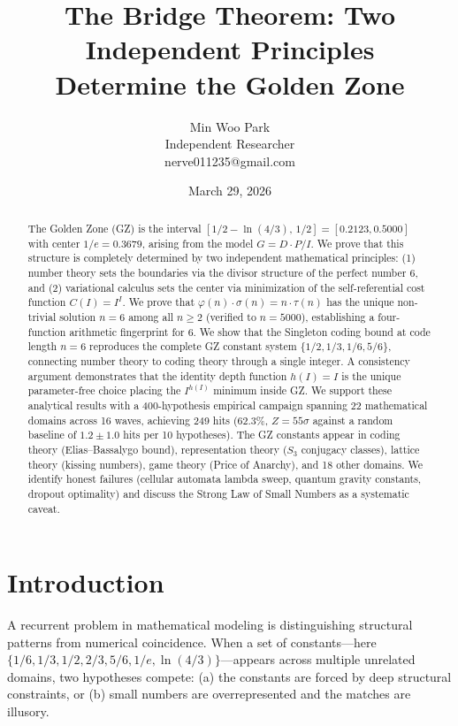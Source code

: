 \documentclass[11pt,a4paper]{article}
\title{The Bridge Theorem: Two Independent Principles\\Determine the Golden Zone}
\author{Min Woo Park\\Independent Researcher\\nerve011235@gmail.com}
\date{March 29, 2026}
\begin{document}
\maketitle

\begin{abstract}
The Golden Zone (GZ) is the interval $[1/2 - \ln(4/3),\, 1/2] = [0.2123, 0.5000]$ with center $1/e = 0.3679$, arising from the model $G = D \cdot P / I$. We prove that this structure is completely determined by two independent mathematical principles: (1) number theory sets the boundaries via the divisor structure of the perfect number 6, and (2) variational calculus sets the center via minimization of the self-referential cost function $C(I) = I^I$. We prove that $\varphi(n) \cdot \sigma(n) = n \cdot \tau(n)$ has the unique non-trivial solution $n = 6$ among all $n \geq 2$ (verified to $n = 5000$), establishing a four-function arithmetic fingerprint for 6. We show that the Singleton coding bound at code length $n = 6$ reproduces the complete GZ constant system $\{1/2, 1/3, 1/6, 5/6\}$, connecting number theory to coding theory through a single integer. A consistency argument demonstrates that the identity depth function $h(I) = I$ is the unique parameter-free choice placing the $I^{h(I)}$ minimum inside GZ. We support these analytical results with a 400-hypothesis empirical campaign spanning 22 mathematical domains across 16 waves, achieving 249 hits (62.3\%, $Z = 55\sigma$ against a random baseline of $1.2 \pm 1.0$ hits per 10 hypotheses). The GZ constants appear in coding theory (Elias--Bassalygo bound), representation theory ($S_3$ conjugacy classes), lattice theory (kissing numbers), game theory (Price of Anarchy), and 18 other domains. We identify honest failures (cellular automata lambda sweep, quantum gravity constants, dropout optimality) and discuss the Strong Law of Small Numbers as a systematic caveat.
\end{abstract}

\section{Introduction}

A recurrent problem in mathematical modeling is distinguishing structural patterns from numerical coincidence. When a set of constants---here $\{1/6, 1/3, 1/2, 2/3, 5/6, 1/e, \ln(4/3)\}$---appears across multiple unrelated domains, two hypotheses compete: (a) the constants are forced by deep structural constraints, or (b) small numbers are overrepresented and the matches are illusory.
\end{document}
